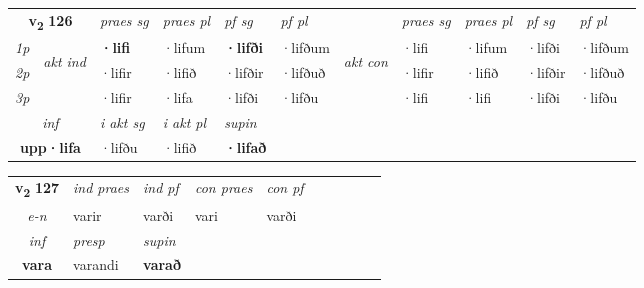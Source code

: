 \noindent
\begin{tabular}{lllllllllll} \toprule
\multicolumn{2}{c}{\textbf{v{\textsubscript{2}}} \Large{\textbf{126}}}  &  \textit{praes sg}  & \textit{praes pl}  &\textit{ pf sg} & \textit{pf pl} &  &  \textit{praes sg}  & \textit{praes pl}  & \textit{pf sg} & \textit{pf pl } \\*
	\cmidrule{3-6} \cmidrule{8-11}
 {\textit{1p}} & \multirow{3}{*}{\begin{turn}{90}\textit{akt ind}\end{turn}} & \textbf{·lifi} & ·lifum & \textbf{·lifði} & ·lifðum & \multirow{3}{*}{\begin{turn}{90}\textit{akt con}\end{turn}} &·lifi & ·lifum & ·lifði & ·lifðum\\*
 {\textit{2p}} &  &  ·lifir  & ·lifið & ·lifðir & ·lifðuð & & ·lifir & ·lifið & ·lifðir & ·lifðuð \\*
{\textit{3p}} &  & ·lifir & ·lifa & ·lifði & ·lifðu & & ·lifi & ·lifi& ·lifði & ·lifðu \\*
\cmidrule{3-6} \cmidrule{8-11}

   \multicolumn{2}{c}{\textit{inf}}  & \textit{i akt sg} & \textit{i akt pl}    & \textit{supin}   \\*
  \multicolumn{2}{c}{\textbf{upp\allowbreak ·lifa}} & ·lifðu  & ·lifið    &  \textbf{·lifað}   \\*
\end{tabular}

\noindent
\begin{tabular}{lllllllllll} \toprule
\multicolumn{2}{c}{\textbf{v{\textsubscript{2}}} \Large{\textbf{127}}}  &  \textit{ind praes} & \textit{ind pf} & \textit{con praes} & \textit{con pf} \\*
\multicolumn{2}{c}{ \textit{e-n} } & varir & varði & vari & varði \\*

\cmidrule{3-4}
   \multicolumn{2}{c}{\textit{inf}}     & \textit{presp} & \textit{supin}   \\*
  \multicolumn{2}{c}{\textbf{vara}}      & varandi &  \textbf{varað}   \\*
\end{tabular}

